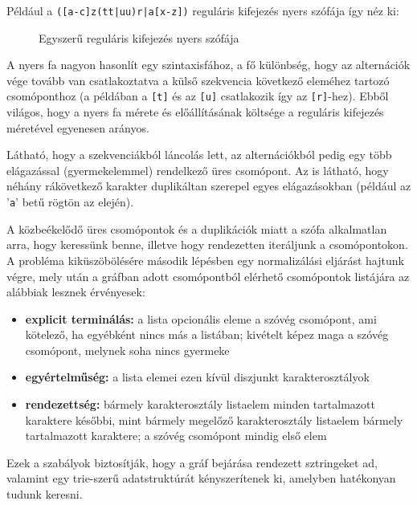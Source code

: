 \documentclass[
    parspace,
    noindent,
    nohyp,
]{elteiktdk}[2023/04/10]
\newcommand{\regextt}[1]{\texttt{\colorbox{verylightgray}{#1}}}
\begin{document}
Például a \regextt{([a-c]z(tt|uu)r|a[x-z])} reguláris kifejezés nyers szófája így néz ki:

\begin{figure}[H]
\centering

\caption{Egyszerű reguláris kifejezés nyers szófája}
\end{figure}

A nyers fa nagyon hasonlít egy szintaxisfához,
a fő különbség, hogy az alternációk vége tovább van csatlakoztatva a külső szekvencia
következő eleméhez tartozó csomóponthoz
(a példában a \regextt{[t]} és az \regextt{[u]} csatlakozik így az \regextt{[r]}-hez).
Ebből világos, hogy a nyers fa mérete és előállításának költsége
a reguláris kifejezés méretével egyenesen arányos.

Látható, hogy a szekvenciákból láncolás lett,
az alternációkból pedig egy több elágazással (gyermekelemmel) rendelkező üres csomópont.
Az is látható, hogy néhány rákövetkező karakter duplikáltan szerepel egyes elágazásokban
(például az '\texttt{a}' betű rögtön az elején).

A közbeékelődő üres csomópontok és a duplikációk miatt
a szófa alkalmatlan arra, hogy keressünk benne,
illetve hogy rendezetten iteráljunk a csomópontokon.
A probléma kiküszöbölésére második lépésben egy normalizálási eljárást hajtunk végre,
mely után a gráfban adott csomópontból elérhető csomópontok listájára az alábbiak lesznek érvényesek:

\begin{itemize}
    \item \textbf{explicit terminálás:} a lista opcionális eleme a szóvég csomópont, ami kötelező, ha egyébként nincs más a listában; kivételt képez maga a szóvég csomópont, melynek soha nincs gyermeke
    \item \textbf{egyértelműség:} a lista elemei ezen kívül diszjunkt karakterosztályok
    \item \textbf{rendezettség:} bármely karakterosztály listaelem minden tartalmazott karaktere későbbi, mint bármely megelőző karakterosztály listaelem bármely tartalmazott karaktere; a szóvég csomópont mindig első elem
\end{itemize}

Ezek a szabályok biztosítják, hogy a gráf bejárása rendezett sztringeket ad,
valamint egy trie-szerű adatstruktúrát kényszerítenek ki, amelyben hatékonyan tudunk keresni.
\end{document}
